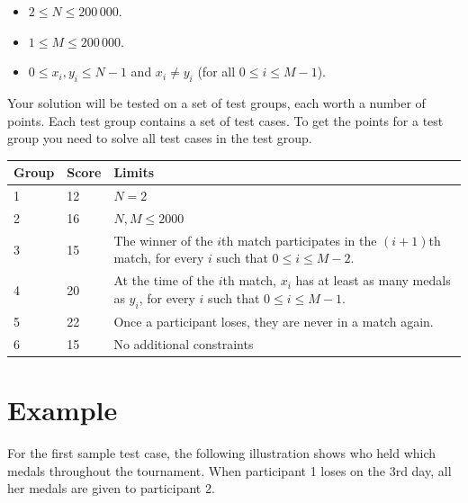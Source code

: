 \begin{itemize}
  \item $2 \leq N \leq 200\,000$.
  \item $1 \leq M \leq 200\,000$.
  \item $0 \le x_i, y_i \le N-1$ and $x_i \neq y_i$ (for all $0\le i \le M-1$).
\end{itemize}

\noindent
Your solution will be tested on a set of test groups, each worth a number of points. 
Each test group contains a set of test cases. To get the points for a test group you need to solve all test cases in the test group.

\noindent
\begin{tabular}{| l | l | l |}
\hline
Group & Score & Limits \\ \hline
1     & 12     & $N = 2$  \\ \hline
2     & 16    & $N, M \le 2000$  \\ \hline
3     & 15    & The winner of the $i$th match participates in the $(i + 1)$th match, for every $i$ such that $0 \le i \le M-2$.  \\ \hline
4     & 20    & At the time of the $i$th match, $x_i$ has at least as many medals as $y_i$, for every $i$ such that $0 \le i \le M-1$. \\ \hline
5     & 22    & Once a participant loses, they are never in a match again.  \\ \hline
6     & 15    & No additional constraints  \\ \hline
\end{tabular}

\section*{Example}

For the first sample test case, the following illustration shows who held which medals throughout the tournament.
When participant 1 loses on the 3rd day, all her medals are given to
participant 2.

